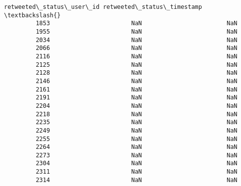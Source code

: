 \documentclass[11pt]{article}
\begin{document}
\begin{Verbatim}[commandchars=\\\{\}]
               retweeted\_status\_user\_id retweeted\_status\_timestamp  \textbackslash{}
         1853                       NaN                        NaN   
         1955                       NaN                        NaN   
         2034                       NaN                        NaN   
         2066                       NaN                        NaN   
         2116                       NaN                        NaN   
         2125                       NaN                        NaN   
         2128                       NaN                        NaN   
         2146                       NaN                        NaN   
         2161                       NaN                        NaN   
         2191                       NaN                        NaN   
         2204                       NaN                        NaN   
         2218                       NaN                        NaN   
         2235                       NaN                        NaN   
         2249                       NaN                        NaN   
         2255                       NaN                        NaN   
         2264                       NaN                        NaN   
         2273                       NaN                        NaN   
         2304                       NaN                        NaN   
         2311                       NaN                        NaN   
         2314                       NaN                        NaN   
         

\end{Verbatim}
\end{document}
